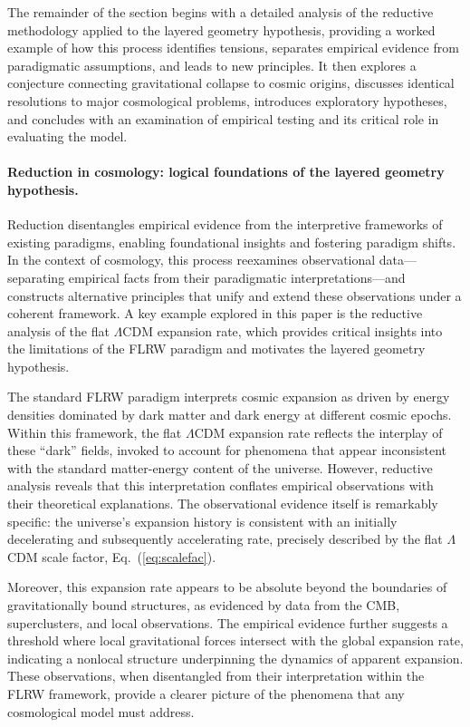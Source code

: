 \documentclass[aps,rmp,groupedaddress,twocolumn,10pt]{revtex4-2}
\begin{document}
The remainder of the section begins with a detailed analysis of the reductive methodology applied to the layered geometry hypothesis, providing a worked example of how this process identifies tensions, separates empirical evidence from paradigmatic assumptions, and leads to new principles. It then explores a conjecture connecting gravitational collapse to cosmic origins, discusses identical resolutions to major cosmological problems, introduces exploratory hypotheses, and concludes with an examination of empirical testing and its critical role in evaluating the model.

\paragraph{Reduction in cosmology: logical foundations of the layered geometry hypothesis.} 
Reduction disentangles empirical evidence from the interpretive frameworks of existing paradigms, enabling foundational insights and fostering paradigm shifts. In the context of cosmology, this process reexamines observational data---separating empirical facts from their paradigmatic interpretations---and constructs alternative principles that unify and extend these observations under a coherent framework. A key example explored in this paper is the reductive analysis of the flat $\Lambda$CDM expansion rate, which provides critical insights into the limitations of the FLRW paradigm and motivates the layered geometry hypothesis.

The standard FLRW paradigm interprets cosmic expansion as driven by energy densities dominated by dark matter and dark energy at different cosmic epochs. Within this framework, the flat $\Lambda$CDM expansion rate reflects the interplay of these ``dark'' fields, invoked to account for phenomena that appear inconsistent with the standard matter-energy content of the universe. However, reductive analysis reveals that this interpretation conflates empirical observations with their theoretical explanations. The observational evidence itself is remarkably specific: the universe's expansion history is consistent with an initially decelerating and subsequently accelerating rate, precisely described by the flat $\Lambda$CDM scale factor, Eq.~(\ref{eq:scalefac}).

Moreover, this expansion rate appears to be absolute beyond the boundaries of gravitationally bound structures, as evidenced by data from the CMB, superclusters, and local observations. The empirical evidence further suggests a threshold where local gravitational forces intersect with the global expansion rate, indicating a nonlocal structure underpinning the dynamics of apparent expansion. These observations, when disentangled from their interpretation within the FLRW framework, provide a clearer picture of the phenomena that any cosmological model must address.
\end{document}
